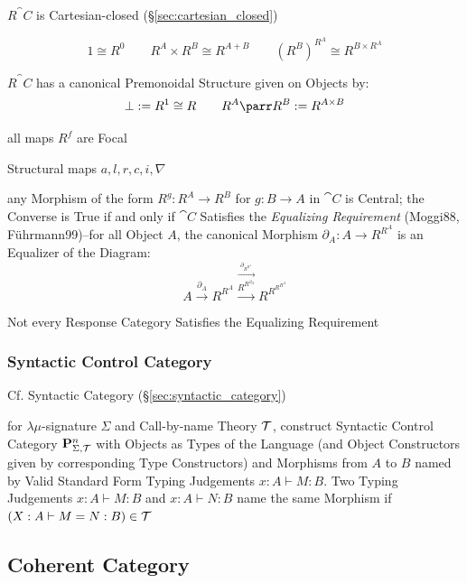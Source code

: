 $R^\cat{C}$ is Cartesian-closed (\S\ref{sec:cartesian_closed})

\[
  1 \cong R^0 \quad\quad R^A \times R^B \cong R^{A+B} \quad\quad
  (R^B)^{R^A} \cong R^{B \times R^A}
\]

$R^\cat{C}$ has a canonical Premonoidal Structure given on Objects by:
\[
  \bot := R^1 \cong R \quad\quad R^A \parr R^B := R^{A \times B}
\]

all maps $R^f$ are Focal

Structural maps $a,l,r,c,i,\nabla$

any Morphism of the form $R^g : R^A \rightarrow R^B$ for $g : B
\rightarrow A$ in $\cat{C}$ is Central; the Converse is True if and
only if $\cat{C}$ Satisfies the \emph{Equalizing Requirement}
(Moggi88, F\"uhrmann99)--for all Object $A$, the canonical Morphism
$\partial_A : A \rightarrow R^{R^A}$ is an Equalizer of the Diagram:
\[
  A \xrightarrow{\partial_A} R^{R^A}
    \stackrel{\xrightarrow{\partial_{R^{R^A}}}}
    {\xrightarrow{R^{R^{\partial_A}}}}
  R^{R^{R^{R^A}}}
\]

\fist Not every Response Category Satisfies the Equalizing Requirement



\subsubsection{Syntactic Control Category}
\label{sec:syntactic_control_category}

\fist Cf. Syntactic Category (\S\ref{sec:syntactic_category})

for $\lambda\mu$-signature $\Sigma$ and Call-by-name Theory
$\mathcal{T}$, construct Syntactic Control Category
$\mathbf{P}^n_{\Sigma,\mathcal{T}}$ with Objects as Types of the Language
(and Object Constructors given by corresponding Type Constructors) and
Morphisms from $A$ to $B$ named by Valid Standard Form Typing
Judgements $x:A \vdash M:B$. Two Typing Judgements $x:A \vdash M:B$
and $x:A \vdash N:B$ name the same Morphism if $(X:A \vdash M=N:B) \in
\mathcal{T}$




\subsection{Coherent Category}\label{sec:coherent_category}

